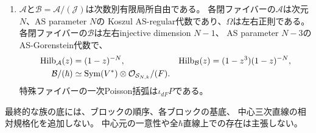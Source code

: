 \begin{theorem}[満support層の全係数にわたる同変中心元]
\begin{enumerate}
\item $\mathcal A$と$\mathcal B=\mathcal A/(\mathcal J)$は次数別有限局所自由である。
各閉ファイバーの$\mathcal A$は次元$N$、AS parameter $N$の
Koszul AS-regular代数であり、$\Omega$は左右正則である。
各閉ファイバーの$\mathcal B$は左右injective dimension $N-1$、
AS parameter $N-3$のAS-Gorenstein代数で、
\begin{equation}
 \begin{aligned}
 \operatorname{Hilb}_{\mathcal A}(z)&=(1-z)^{-N},&
 \operatorname{Hilb}_{\mathcal B}(z)&=(1-z^3)(1-z)^{-N},\\
 \mathcal B/(\hbar)&\simeq
 \operatorname{Sym}(V^*)\otimes\mathcal O_{\mathcal S_{N,k}}/(F).
 \end{aligned}
 \label{eq:pg-full-support-flat-quotient}
\end{equation}
特殊ファイバーの一次Poisson括弧は$\iota_{dF}P$である。
\end{enumerate}
最終的な族の底には、ブロックの順序、各ブロックの基底、
中心三次直線の相対規格化を追加しない。
中心元の一意性や全$\hbar$直線上での存在は主張しない。
\end{theorem}
